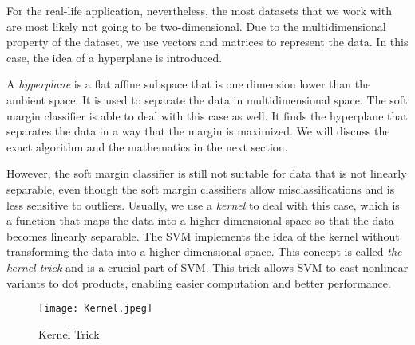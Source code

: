 For the real-life application, nevertheless, the most datasets that we work with are
most likely not going to be two-dimensional. Due to the multidimensional property of the dataset,
we use vectors and matrices to represent the data. In this case, the idea of a hyperplane is introduced. 

A \emph{hyperplane} is a flat affine subspace that is one dimension lower than the ambient space.\cite{R9}
It is used to separate the data in multidimensional space. The soft margin classifier is able to deal with this case as well.
It finds the hyperplane that separates the data in a way that the margin is maximized. We will discuss the exact algorithm and the
mathematics in the next section.

However, the soft margin classifier is still not suitable for data that is not linearly separable, even though 
the soft margin classifiers allow misclassifications and is less sensitive to outliers. Usually, we use a \emph{kernel} to deal 
with this case, which is a function that maps the data into a higher dimensional space so that the data becomes linearly
separable. The SVM implements the idea of the kernel without transforming the data into a higher dimensional space. This concept is 
called \emph{the kernel trick} and is a crucial part of SVM. This trick allows SVM to cast nonlinear variants to dot products,
enabling easier computation and better performance. \cite{Kernel2}
\begin{figure}[h]%
    \begin{center}%
        \texttt{[image: Kernel.jpeg]}%
        \caption{Kernel Trick \cite{imgintro}}\label{fig:}%
    \end{center}%
\end{figure}
